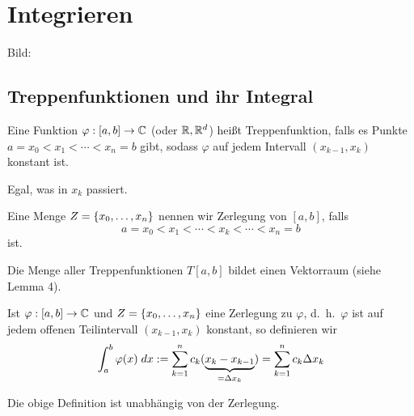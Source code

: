\documentclass[../ana2.tex]{subfiles}
\begin{document}
\setcounter{section}{3}
\section{Integrieren}
Bild:
\subsection{Treppenfunktionen und ihr Integral}
\begin{defi}
    Eine Funktion \( \abb{\varphi}{[a,b]}{\C} \) 
    (oder \(\R, \R^d\))
    heißt Treppenfunktion, falls es Punkte 
    \( a=x_0 < x_1 < \cdots < x_n = b \) gibt, sodass 
    \( \varphi \) auf jedem Intervall \( (x_{k-1}, x_k) \)
    konstant ist.    
\end{defi}
\begin{bem}
    Egal, was in \(x_k\) passiert.
\end{bem}
\begin{bem}
    Eine Menge \( Z = \set{x_0, \ldots, x_n} \) nennen 
    wir Zerlegung von \( [a,b] \), falls 
    \[ a = x_0 < x_1 < \cdots < x_k < \cdots < x_n = b \]
    ist.
\end{bem}
Die Menge aller Treppenfunktionen \( T[a,b] \) bildet 
einen Vektorraum (siehe Lemma 4).
\begin{defi}
    Ist \( \abb{\varphi}{[a,b]}{\C} \) und 
    \( Z = \set{x_0, \ldots, x_n} \) eine Zerlegung 
     zu \( \varphi \), d.\ h.\  \( \varphi \) 
    ist auf jedem offenen Teilintervall \( (x_{k-1}, x_k) \) 
    konstant, so definieren wir 
    \[ \integral{\varphi(x)}{a}{b} 
    := \sum_{k=1}^n c_k (\underbrace{x_k - x_{k-1}}_{= \Delta x_k})
    = \sum_{k=1}^n c_k \Delta x_k \]
\end{defi}
\begin{lem}
    Die obige Definition ist unabhängig von der Zerlegung.
\end{lem}
\end{document}
